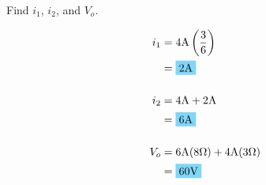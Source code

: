Find $i_1$, $i_2$, and $V_o$.

\begin{align*}
	i_1&=4\qw{\A}\left(\frac{3}{6}\right) \\
	&= \hlbox{2\qw{\A}} \\[5mm]
	i_2&=4\qw{\A}+2\qw{\A} \\
	&= \hlbox{6\qw{\A}} \\[5mm]
	V_o &= 6\qw{\A}(8\qw{\ohm})+4\qw{\A}(3\qw{\ohm}) \\
	&= \hlbox{60\qw{\V}}
\end{align*}